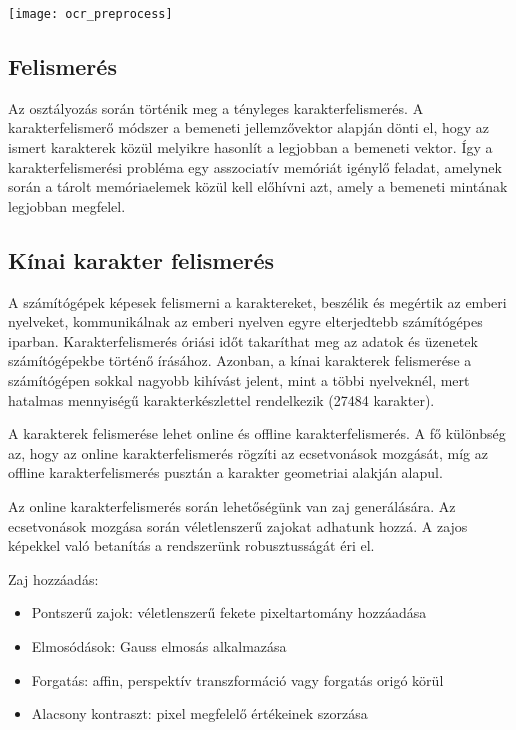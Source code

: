 \begin{center}
\texttt{[image: ocr\_preprocess]}
\end{center}

\subsection{Felismerés}

Az osztályozás során történik meg a tényleges karakterfelismerés. A karakterfelismerő módszer a bemeneti jellemzővektor alapján dönti el, hogy az ismert karakterek közül melyikre hasonlít a legjobban a bemeneti vektor. Így a karakterfelismerési probléma egy asszociatív memóriát igénylő feladat, amelynek során a tárolt memóriaelemek közül kell előhívni azt, amely a bemeneti mintának legjobban megfelel.\\

\subsection{Kínai karakter felismerés}

A számítógépek képesek felismerni a karaktereket, beszélik és megértik az emberi nyelveket, kommunikálnak az emberi nyelven egyre elterjedtebb számítógépes iparban. Karakterfelismerés óriási időt takaríthat meg az adatok és üzenetek számítógépekbe történő írásához. Azonban, a kínai karakterek felismerése a számítógépen sokkal nagyobb kihívást jelent, mint a többi nyelveknél, mert hatalmas mennyiségű karakterkészlettel rendelkezik (27484 karakter).

A karakterek felismerése lehet online és offline karakterfelismerés. A fő különbség az, hogy az online karakterfelismerés rögzíti az ecsetvonások mozgását, míg az offline karakterfelismerés pusztán a karakter geometriai alakján alapul.

Az online karakterfelismerés során lehetőségünk van zaj generálására. Az ecsetvonások mozgása során véletlenszerű zajokat adhatunk hozzá. A zajos képekkel való betanítás a rendszerünk robusztusságát éri el.

Zaj hozzáadás:
\begin{itemize}
\item Pontszerű zajok: véletlenszerű fekete pixeltartomány hozzáadása
\item Elmosódások: Gauss elmosás alkalmazása
\item Forgatás: affin, perspektív transzformáció vagy forgatás origó körül 
\item Alacsony kontraszt: pixel megfelelő értékeinek szorzása
\end{itemize}


